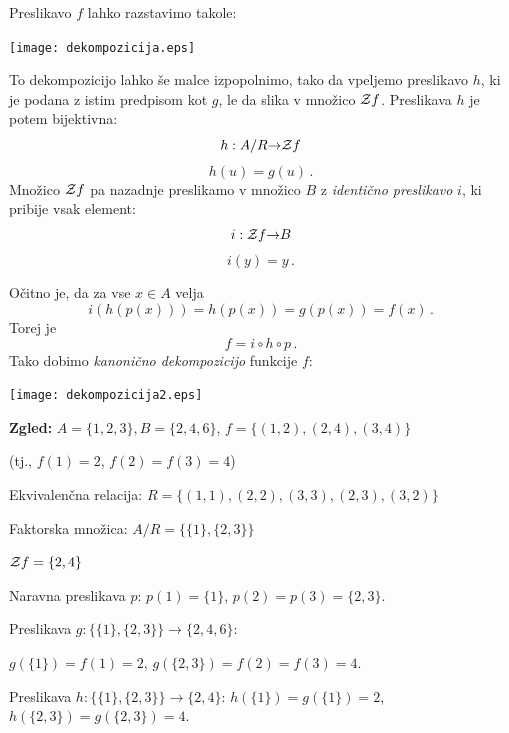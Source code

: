 \documentclass[11pt,paper=b5,footinclude,headinclude]{scrbook} %
\def\cee {{~\Leftrightarrow~}}
\begin{document}
Preslikavo $f$ lahko razstavimo takole:
\begin{center}
\texttt{[image: dekompozicija.eps]}
\end{center}

To dekompozicijo lahko še malce izpopolnimo, tako da vpeljemo preslikavo $h$, ki
je podana z istim predpisom kot $g$, le da slika v množico ${\cal Z}f$. Preslikava $h$ je potem bijektivna:
$$h:A/R{\to} {\cal Z}f$$
$$h(u) = g(u)\,.$$
Množico ${\cal Z}f$ pa nazadnje preslikamo v množico $B$ z {\em identično preslikavo} $i$, ki pribije vsak element:
$$i:{\cal Z}f{\to}B$$
$$i(y) = y\,.$$

Očitno je, da za vse $x\in A$ velja
$$i(h(p(x))) = h(p(x)) = g(p(x)) = f(x)\,.$$
Torej je
$$f = i\circ h\circ p\,.$$
Tako dobimo {\em kanonično dekompozicijo} funkcije $f$:
\begin{center}
\texttt{[image: dekompozicija2.eps]}
\end{center}

\textbf{ Zgled:}
$A = \{1,2,3\}, B = \{2,4,6\}$,
$f = \{(1,2),(2,4),(3,4)\}$

(tj., $f(1) = 2$, $f(2)= f(3) = 4$)

Ekvivalenčna relacija: $R = \{(1,1),(2,2),(3,3),(2,3),(3,2)\}$

Faktorska množica: $A/R = \{\{1\},\{2,3\}\}$

${\cal Z} f = \{2,4\}$

Naravna preslikava $p$: $p(1) = \{1\}$, $p(2) = p(3) = \{2,3\}$.

Preslikava $g: \{\{1\},\{2,3\}\}\to \{2,4,6\}$:

$g(\{1\}) = f(1) = 2$, $g(\{2,3\}) = f(2) = f(3) = 4$.

Preslikava $h: \{\{1\},\{2,3\}\}\to \{2,4\}$:
$h(\{1\}) = g(\{1\}) = 2$, $h(\{2,3\}) = g(\{2,3\}) = 4$.
\end{document}
